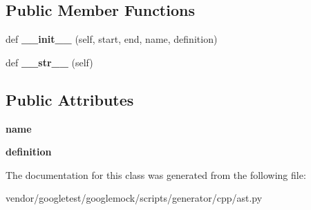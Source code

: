 \subsection*{Public Member Functions}
\begin{DoxyCompactItemize}
\item 
\mbox{\label{classcpp_1_1ast_1_1_define_ae9af61866e010a863ba9f8818ec8924c}} 
def {\bfseries \+\_\+\+\_\+init\+\_\+\+\_\+} (self, start, end, name, definition)
\item 
\mbox{\label{classcpp_1_1ast_1_1_define_aa89732914b19901c8d291e11f34bb627}} 
def {\bfseries \+\_\+\+\_\+str\+\_\+\+\_\+} (self)
\end{DoxyCompactItemize}
\subsection*{Public Attributes}
\begin{DoxyCompactItemize}
\item 
\mbox{\label{classcpp_1_1ast_1_1_define_a8879216f09e88f79d7baa49bcfa10ebd}} 
{\bfseries name}
\item 
\mbox{\label{classcpp_1_1ast_1_1_define_a0c636652dfeb2f15e62793afea1153c9}} 
{\bfseries definition}
\end{DoxyCompactItemize}


The documentation for this class was generated from the following file\+:\begin{DoxyCompactItemize}
\item 
vendor/googletest/googlemock/scripts/generator/cpp/ast.\+py\end{DoxyCompactItemize}
